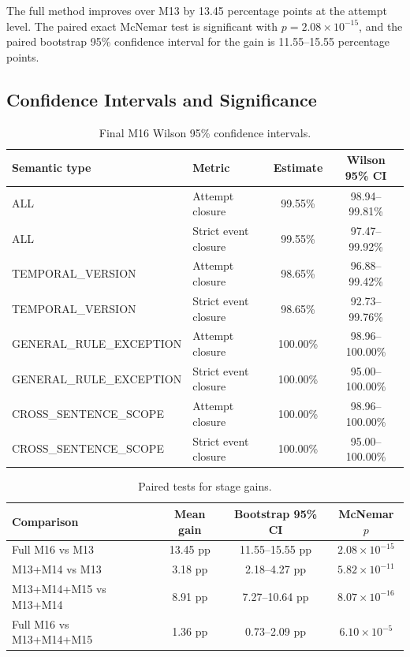 \documentclass[11pt]{article}
\begin{document}
The full method improves over M13 by 13.45 percentage points at the attempt level. The paired exact McNemar test is significant with $p=2.08\times10^{-15}$, and the paired bootstrap 95\% confidence interval for the gain is 11.55--15.55 percentage points.

\subsection{Confidence Intervals and Significance}

\begin{table}[t]
\centering
\caption{Final M16 Wilson 95\% confidence intervals.}
\label{tab:ci}
\begin{tabular}{llcc}
\toprule
Semantic type & Metric & Estimate & Wilson 95\% CI \\
\midrule
ALL & Attempt closure & 99.55\% & 98.94--99.81\% \\
ALL & Strict event closure & 99.55\% & 97.47--99.92\% \\
TEMPORAL\_VERSION & Attempt closure & 98.65\% & 96.88--99.42\% \\
TEMPORAL\_VERSION & Strict event closure & 98.65\% & 92.73--99.76\% \\
GENERAL\_RULE\_EXCEPTION & Attempt closure & 100.00\% & 98.96--100.00\% \\
GENERAL\_RULE\_EXCEPTION & Strict event closure & 100.00\% & 95.00--100.00\% \\
CROSS\_SENTENCE\_SCOPE & Attempt closure & 100.00\% & 98.96--100.00\% \\
CROSS\_SENTENCE\_SCOPE & Strict event closure & 100.00\% & 95.00--100.00\% \\
\bottomrule
\end{tabular}
\end{table}

\begin{table}[t]
\centering
\caption{Paired tests for stage gains.}
\label{tab:tests}
\begin{tabular}{lccc}
\toprule
Comparison & Mean gain & Bootstrap 95\% CI & McNemar $p$ \\
\midrule
Full M16 vs M13 & 13.45 pp & 11.55--15.55 pp & $2.08\times10^{-15}$ \\
M13+M14 vs M13 & 3.18 pp & 2.18--4.27 pp & $5.82\times10^{-11}$ \\
M13+M14+M15 vs M13+M14 & 8.91 pp & 7.27--10.64 pp & $8.07\times10^{-16}$ \\
Full M16 vs M13+M14+M15 & 1.36 pp & 0.73--2.09 pp & $6.10\times10^{-5}$ \\
\bottomrule
\end{tabular}
\end{table}
\end{document}

